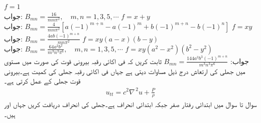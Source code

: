 \quad
$f=1$\\
جواب:\quad
$B_{mn}=\tfrac{16}{mn\pi^2}, \quad m,n=1,3,5,\cdots$
\quad
$f=x+y$\\
جواب:\quad
$B_{mn}=\tfrac{4}{mn\pi^2}[a(-1)^{m+n}-a(-1)^m+b(-1)^{m+n}-b(-1)^n]$
\quad
$f=xy$\\
جواب:\quad
$B_{mn}=\tfrac{4ab(-1)^{m+n}}{mn\pi^2}$
\quad
$f=xy(a-x)(b-y)$\\
جواب:\quad
$B_{mn}=\tfrac{64a^2b^2}{m^3n^3\pi^6},\quad m,n=1,3,5,\cdots$
\quad
$f=xy(a^2-x^2)(b^2-y^2)$\\
جواب:\quad
$B_{mn}=\tfrac{144a^3b^3(-1)^{m+n}}{m^3n^3\pi^6}$
\quad
ثابت کریں کہ فی اکائی رقبہ بیرونی قوت  کی صورت میں  مستوی میں جھلی کی ارتعاش درج ذیل مساوات دیتی ہے جہاں فی اکائی رقبہ جھلی کی کمیت  ہے۔بیرونی قوت جھلی کے   عمل کرتی ہے۔
\begin{align*}
u_{tt}=c^2\nabla^{\,2}u+\frac{P}{\rho}
\end{align*}
سوال  تا سوال  میں ابتدائی رفتار صفر  جبکہ ابتدائی انحراف  ہے۔جھلی کی انحراف  دریافت کریں جہاں  اور  ہیں۔

